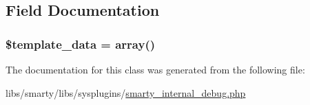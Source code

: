\subsection{Field Documentation}
\hypertarget{class_smarty___internal___debug_adf3ad7b54af90b5ed9a53fcbdfdaa7e0}{}
\subsubsection[{\$template\+\_\+data}]{\setlength{\rightskip}{0pt plus 5cm}\$template\+\_\+data = array()\hspace{0.3cm}{\ttfamily [static]}}\label{class_smarty___internal___debug_adf3ad7b54af90b5ed9a53fcbdfdaa7e0}


The documentation for this class was generated from the following file\+:\begin{DoxyCompactItemize}
\item 
libs/smarty/libs/sysplugins/\hyperlink{smarty__internal__debug_8php}{smarty\+\_\+internal\+\_\+debug.\+php}\end{DoxyCompactItemize}

